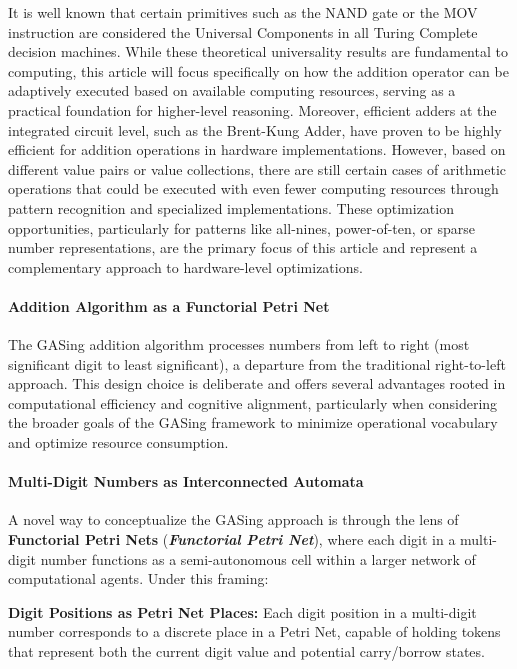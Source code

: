 It is well known that certain primitives such as the NAND gate or the MOV instruction are considered the Universal Components in all Turing Complete decision machines. While these theoretical universality results are fundamental to computing, this article will focus specifically on how the addition operator can be adaptively executed based on available computing resources, serving as a practical foundation for higher-level reasoning. Moreover, efficient adders at the integrated circuit level, such as the Brent-Kung Adder, have proven to be highly efficient for addition operations in hardware implementations. However, based on different value pairs or value collections, there are still certain cases of arithmetic operations that could be executed with even fewer computing resources through pattern recognition and specialized implementations. These optimization opportunities, particularly for patterns like all-nines, power-of-ten, or sparse number representations, are the primary focus of this article and represent a complementary approach to hardware-level optimizations.
\paragraph{Addition Algorithm as a Functorial Petri Net}

The GASing addition algorithm processes numbers from left to right (most significant digit to least significant), a departure from the traditional right-to-left approach. This design choice is deliberate and offers several advantages rooted in computational efficiency and cognitive alignment, particularly when considering the broader goals of the GASing framework to minimize operational vocabulary and optimize resource consumption.
\paragraph{Multi-Digit Numbers as Interconnected Automata}

A novel way to conceptualize the GASing approach is through the lens of \textbf{Functorial Petri Nets} (\textbf{\textit{Functorial Petri Net}}), where each digit in a multi-digit number functions as a semi-autonomous cell within a larger network of computational agents. Under this framing:


\noindent\textbf{\textbf{Digit Positions as Petri Net Places}:} Each digit position in a multi-digit number corresponds to a discrete place in a Petri Net, capable of holding tokens that represent both the current digit value and potential carry/borrow states.



